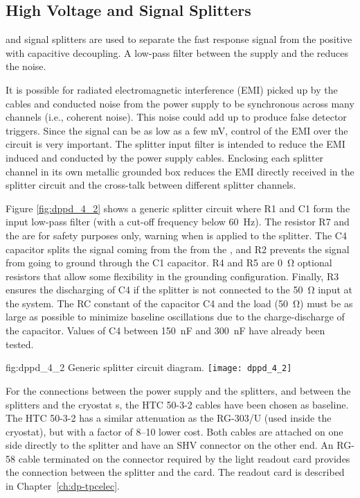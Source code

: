 \subsection{High Voltage and Signal Splitters}
\label{sec:fddp-pd-4.2}

 and signal splitters 
are used to separate the fast  response signal from the positive  with capacitive decoupling. 
A low-pass filter between the  supply and the  reduces the noise.

It is possible for radiated electromagnetic interference (EMI) picked up by the cables and conducted noise from the  power supply to be synchronous across many  channels (i.e., coherent noise). This noise could add up to produce false detector triggers. Since the  signal can be as low as a few \si{mV},
control of the EMI over the circuit is very important. The splitter  input filter is intended to reduce the EMI induced and conducted by the power supply cables. Enclosing each splitter channel in its own metallic grounded box reduces the EMI directly received in the splitter circuit and 
the cross-talk between different splitter channels.

Figure \ref{fig:dppd_4_2} shows a generic splitter circuit where R1 and C1 form the  input low-pass filter (with a cut-off frequency below \SI{60}{Hz}). The resistor R7 and the   are for safety purposes only, warning when  is applied to the splitter. The C4 capacitor splits the signal coming from the  from the , and R2 prevents the  signal from going to ground through the C1 capacitor. R4 and R5 are \SI{0}{\ohm} optional resistors that allow some flexibility in the grounding configuration. Finally, R3 ensures the discharging of C4 if the splitter is not connected to the \SI{50}{\ohm} input at the  system. The RC constant of the capacitor C4 and the load (\SI{50}{\ohm}) must be as large as possible to minimize baseline oscillations due to the charge-discharge of the capacitor. Values of C4 between \SI{150}{nF} and \SI{300}{nF} have already been tested.

\begin{dunefigure}{fig:dppd_4_2}
{Generic splitter circuit diagram.}
\texttt{[image: dppd\_4\_2]}
\end{dunefigure}

For the connections between the  power supply and the splitters, and between the splitters and the cryostat \fdth{}s, the HTC 50-3-2 cables have been chosen as baseline. The HTC 50-3-2 has a similar attenuation as the RG-303/U (used inside the cryostat), but with a factor of \numrange{8}{10} lower cost. Both cables are attached on one side directly to the  splitter and have an SHV connector on the other end. An RG-58 cable terminated on the connector required by the light readout card provides the connection between the splitter and the card. The  readout card is described in Chapter~\ref{ch:dp-tpcelec}.


